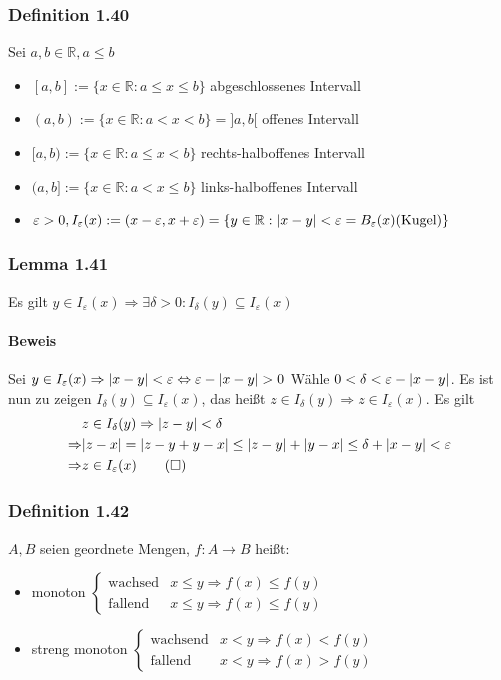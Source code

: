 \documentclass[a4paper]{scrartcl}
\DeclarePairedDelimiter\abs{\lvert}{\rvert}%
\begin{document}
\subsubsection{Definition 1.40}
\label{sec-2-9-8}
Sei $a,b\in\mathbb{R},a\leq b$
\begin{itemize}
\item $[a,b]:=\{x\in\mathbb{R}: a\leq x \leq b\}$ \hfill abgeschlossenes Intervall
\item $(a,b):= \{x\in\mathbb{R}: a < x < b\} = ]a,b[$ \hfill offenes Intervall
\item $[a,b) := \{x\in\mathbb{R}:a\leq x < b\}$ \hfill rechts-halboffenes Intervall
\item $(a,b]:=\{x\in\mathbb{R}:a<x\leq b\}$ \hfill links-halboffenes Intervall
\item $\varepsilon > 0, I_\varepsilon (x) := (x -\varepsilon,x + \varepsilon) = \{y\in\mathbb{R}:\abs{x - y} < \varepsilon = B_\varepsilon (x) (\text{Kugel})\}$
\end{itemize}
\subsubsection{Lemma 1.41}
\label{sec-2-9-9}
Es gilt $y\in I_\varepsilon (x) \Rightarrow \exists \delta > 0: I_\delta (y) \subseteq I_\varepsilon (x)$
\paragraph{Beweis}
\label{sec-2-9-9-1}
Sei $y\in I_\varepsilon (x) \Rightarrow \abs{x - y}  < \varepsilon \Leftrightarrow \varepsilon - \abs{x - y} > 0$
Wähle $0 < \delta < \varepsilon - \abs{x - y}$. Es ist nun zu zeigen $I_\delta (y) \subseteq I_\varepsilon (x)$, das heißt
$z\in I_\delta(y) \Rightarrow z\in I_\varepsilon(x)$. Es gilt
\begin{align}
&z\in I_\delta (y) \Rightarrow \abs{z - y}  <\delta \\
\Rightarrow &\abs{z - x} = \abs{z - y + y - x} \leq \abs{z - y} + \abs{y - x} \leq \delta + \abs{x - y} < \varepsilon \\
\Rightarrow &z\in I_\varepsilon (x) \tag{$\square$}
\end{align}
\subsubsection{Definition 1.42}
\label{sec-2-9-10}
$A,B$ seien geordnete Mengen, $f:A\to B$ heißt:
\begin{itemize}
\item monoton $\begin{cases} \text{wachsed} & x \leq y \Rightarrow f(x) \leq f(y)  \\ \text{fallend} & x \leq y \Rightarrow  f(x) \leq f(y) \end{cases}$
\item streng monoton $\begin{cases} \text{wachsend} & x < y \Rightarrow f(x) < f(y) \\ \text{fallend} & x < y \Rightarrow f(x) > f(y) \end{cases}$
\end{itemize}
\end{document}
